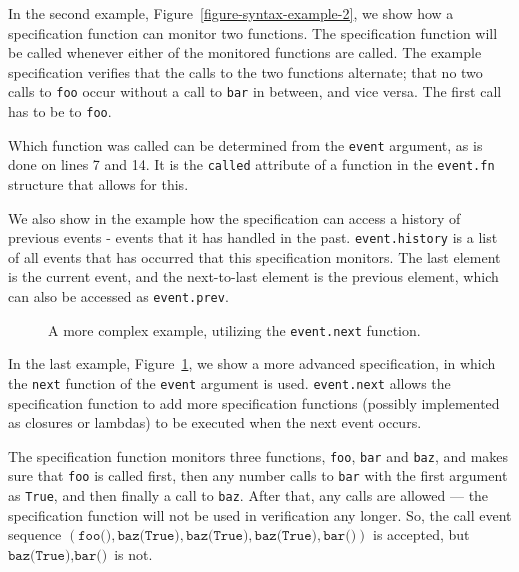 \documentclass[a4paper,11pt]{kth-mag}
\theoremstyle{definition}
\begin{document}
In the second example, Figure~\ref{figure-syntax-example-2}, we show how a
specification function can monitor two functions. The specification function
will be called whenever either of the monitored functions are called. The
example specification verifies that the calls to the two functions alternate;
that no two calls to \texttt{foo} occur without a call to \texttt{bar} in
between, and vice versa. The first call has to be to \texttt{foo}.

Which function was called can be determined from the \texttt{event} argument,
as is done on lines 7 and 14. It is the \texttt{called} attribute of a function
in the \texttt{event.fn} structure that allows for this.

We also show in the example how the specification can access a history of
previous events - events that it has handled in the past.
\texttt{event.history} is a list of all events that has occurred that this
specification monitors. The last element is the current event, and the
next-to-last element is the previous element, which can also be accessed as
\texttt{event.prev}.

\begin{figure}[h!]
	\begin{center}
	\begin{minipage}{0.7\textwidth}
	
	\end{minipage}
	\end{center}

  \caption{A more complex example, utilizing the \texttt{event.next} function.}
	\label{figure-syntax-example-3}
\end{figure}

In the last example, Figure~\ref{figure-syntax-example-3}, we show a more
advanced specification, in which the \texttt{next} function of the
\texttt{event} argument is used. \texttt{event.next} allows the specification
function to add more specification functions (possibly implemented as closures
or lambdas) to be executed when the next event occurs.

The specification function monitors three functions, \texttt{foo}, \texttt{bar}
and \texttt{baz}, and makes sure that \texttt{foo} is called first, then any
number calls to \texttt{bar} with the first argument as \texttt{True}, and then
finally a call to \texttt{baz}. After that, any calls are allowed --- the
specification function will not be used in verification any longer. So, the
call event sequence $(\texttt{foo()}, \texttt{baz(True)}, \texttt{baz(True)},
\texttt{baz(True)}, \texttt{bar()})$ is accepted, but $\texttt{baz(True)},
\texttt{bar()}$ is not.
\end{document}
